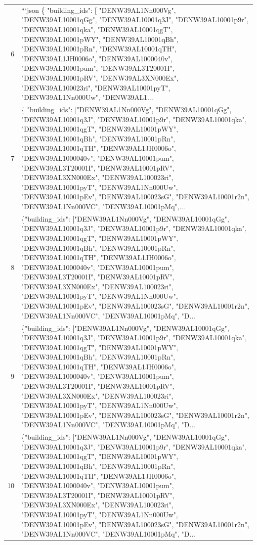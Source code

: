 \documentclass[a4paper,11pt]{article}
\begin{document}
\begin{table}[ht]
\begin{tabular}{r p{12cm}}
6 & ```json
\{
  "building\_ids": [
    "DENW39AL1Nn000Vg",
    "DENW39AL10001qGg",
    "DENW39AL10001q3J",
    "DENW39AL10001p9r",
    "DENW39AL10001qka",
    "DENW39AL10001qgT",
    "DENW39AL10001pWY",
    "DENW39AL10001qBh",
    "DENW39AL10001pRn",
    "DENW39AL10001qTH",
    "DENW39AL1JH0006o",
    "DENW39AL1000040v",
    "DENW39AL10001pum",
    "DENW39AL3T20001I",
    "DENW39AL10001pRV",
    "DENW39AL3XN000Ex",
    "DENW39AL100023ri",
    "DENW39AL10001pyT",
    "DENW39AL1Nn000Uw",
    "DENW39AL1... \\
7 & \{
  "building\_ids": ["DENW39AL1Nn000Vg", "DENW39AL10001qGg", "DENW39AL10001q3J", "DENW39AL10001p9r", "DENW39AL10001qka", "DENW39AL10001qgT", "DENW39AL10001pWY", "DENW39AL10001qBh", "DENW39AL10001pRn", "DENW39AL10001qTH", "DENW39AL1JH0006o", "DENW39AL1000040v", "DENW39AL10001pum", "DENW39AL3T20001I", "DENW39AL10001pRV", "DENW39AL3XN000Ex", "DENW39AL100023ri", "DENW39AL10001pyT", "DENW39AL1Nn000Uw", "DENW39AL10001pEv", "DENW39AL100023sG", "DENW39AL10001r2n", "DENW39AL1Nn000VC", "DENW39AL10001pMq",... \\
8 & \{"building\_ids": ["DENW39AL1Nn000Vg", "DENW39AL10001qGg", "DENW39AL10001q3J", "DENW39AL10001p9r", "DENW39AL10001qka", "DENW39AL10001qgT", "DENW39AL10001pWY", "DENW39AL10001qBh", "DENW39AL10001pRn", "DENW39AL10001qTH", "DENW39AL1JH0006o", "DENW39AL1000040v", "DENW39AL10001pum", "DENW39AL3T20001I", "DENW39AL10001pRV", "DENW39AL3XN000Ex", "DENW39AL100023ri", "DENW39AL10001pyT", "DENW39AL1Nn000Uw", "DENW39AL10001pEv", "DENW39AL100023sG", "DENW39AL10001r2n", "DENW39AL1Nn000VC", "DENW39AL10001pMq", "D... \\
9 & \{"building\_ids": ["DENW39AL1Nn000Vg", "DENW39AL10001qGg", "DENW39AL10001q3J", "DENW39AL10001p9r", "DENW39AL10001qka", "DENW39AL10001qgT", "DENW39AL10001pWY", "DENW39AL10001qBh", "DENW39AL10001pRn", "DENW39AL10001qTH", "DENW39AL1JH0006o", "DENW39AL1000040v", "DENW39AL10001pum", "DENW39AL3T20001I", "DENW39AL10001pRV", "DENW39AL3XN000Ex", "DENW39AL100023ri", "DENW39AL10001pyT", "DENW39AL1Nn000Uw", "DENW39AL10001pEv", "DENW39AL100023sG", "DENW39AL10001r2n", "DENW39AL1Nn000VC", "DENW39AL10001pMq", "D... \\
10 & \{"building\_ids": ["DENW39AL1Nn000Vg", "DENW39AL10001qGg", "DENW39AL10001q3J", "DENW39AL10001p9r", "DENW39AL10001qka", "DENW39AL10001qgT", "DENW39AL10001pWY", "DENW39AL10001qBh", "DENW39AL10001pRn", "DENW39AL10001qTH", "DENW39AL1JH0006o", "DENW39AL1000040v", "DENW39AL10001pum", "DENW39AL3T20001I", "DENW39AL10001pRV", "DENW39AL3XN000Ex", "DENW39AL100023ri", "DENW39AL10001pyT", "DENW39AL1Nn000Uw", "DENW39AL10001pEv", "DENW39AL100023sG", "DENW39AL10001r2n", "DENW39AL1Nn000VC", "DENW39AL10001pMq", "D... \\
\hline
\end{tabular}
\end{table}
\end{document}
